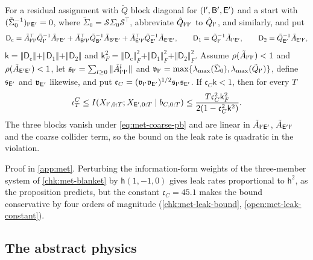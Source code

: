 \begin{proposition}\label{prop:met-leak-bound}
For a residual assignment with $\tilde Q$ block diagonal for $(\mathsf{I}',\mathsf{B}',\mathsf{E}')$ and a start with $(\tilde\Sigma_0^{-1})_{\mathsf{I}'\mathsf{E}'}=0$, where $\tilde\Sigma_0=\mathcal S\Sigma_0\mathcal S^\top$, abbreviate $\tilde Q_{\mathsf{I}'\mathsf{I}'}$ to $\tilde Q_{\mathsf{I}'}$, and similarly, and put
\begin{equation}\label{eq:met-leak-blocks}
\mathsf D_{\mathrm c}=\tilde A_{\mathsf{I}'\mathsf{I}'}^\top\tilde Q_{\mathsf{I}'}^{-1}\tilde A_{\mathsf{I}'\mathsf{E}'}+\tilde A_{\mathsf{B}'\mathsf{I}'}^\top\tilde Q_{\mathsf{B}'}^{-1}\tilde A_{\mathsf{B}'\mathsf{E}'}+\tilde A_{\mathsf{E}'\mathsf{I}'}^\top\tilde Q_{\mathsf{E}'}^{-1}\tilde A_{\mathsf{E}'\mathsf{E}'},\qquad\mathsf D_1=\tilde Q_{\mathsf{I}'}^{-1}\tilde A_{\mathsf{I}'\mathsf{E}'},\qquad\mathsf D_2=\tilde Q_{\mathsf{E}'}^{-1}\tilde A_{\mathsf{E}'\mathsf{I}'},
\end{equation}
$\mathsf k=\Vert\mathsf D_{\mathrm c}\Vert+\Vert\mathsf D_1\Vert+\Vert\mathsf D_2\Vert$ and $\mathsf k_F^2=\Vert\mathsf D_{\mathrm c}\Vert_F^2+\Vert\mathsf D_1\Vert_F^2+\Vert\mathsf D_2\Vert_F^2$. Assume $\rho(\tilde A_{\mathsf{I}'\mathsf{I}'})<1$ and $\rho(\tilde A_{\mathsf{E}'\mathsf{E}'})<1$, let $\mathfrak s_{\mathsf{I}'}=\sum_{l\ge0}\Vert\tilde A_{\mathsf{I}'\mathsf{I}'}^l\Vert$ and $\mathfrak v_{\mathsf{I}'}=\max\{\lambda_{\max}(\tilde\Sigma_0),\lambda_{\max}(\tilde Q_{\mathsf{I}'})\}$, define $\mathfrak s_{\mathsf{E}'}$ and $\mathfrak v_{\mathsf{E}'}$ likewise, and put $\mathfrak c_C=(\mathfrak v_{\mathsf{I}'}\mathfrak v_{\mathsf{E}'})^{1/2}\mathfrak s_{\mathsf{I}'}\mathfrak s_{\mathsf{E}'}$. If $\mathfrak c_C\mathsf k<1$, then for every $T$
\begin{equation}\label{eq:met-leak-bound}
\iota^C_T\le I(X_{\mathsf{I}',0:T};X_{\mathsf{E}',0:T}\mid b_{C,0:T})\le\frac{T\mathfrak c_C^2\mathsf k_F^2}{2(1-\mathfrak c_C^2\mathsf k^2)}.
\end{equation}
The three blocks vanish under \eqref{eq:met-coarse-pb} and are linear in $\tilde A_{\mathsf{I}'\mathsf{E}'}$, $\tilde A_{\mathsf{E}'\mathsf{I}'}$ and the coarse collider term, so the bound on the leak rate is quadratic in the violation.
\end{proposition}
Proof in \cref{app:met}. Perturbing the information-form weights of the three-member system of \cref{chk:met-blanket} by $\mathsf h(1,-1,0)$ gives leak rates proportional to $\mathsf h^2$, as the proposition predicts, but the constant $\mathfrak c_C=45.1$ makes the bound conservative by four orders of magnitude (\cref{chk:met-leak-bound}, \cref{open:met-leak-constant}).

\subsection{The abstract physics}\label{sec:met-physics}

